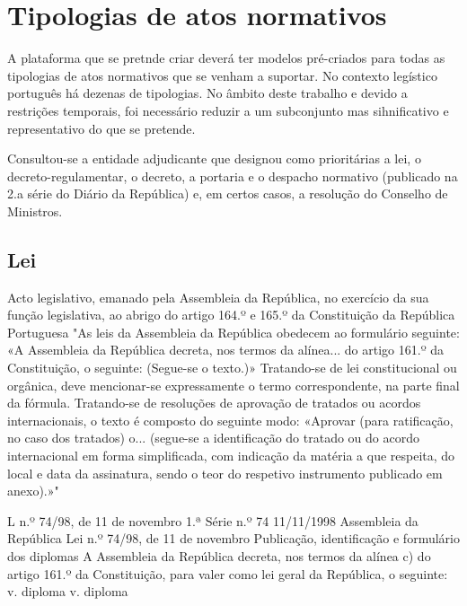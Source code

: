 \chapter{Tipologias de atos normativos}
\label{tipologias}

A plataforma que se pretnde criar deverá ter modelos pré-criados para todas as tipologias de atos normativos 
que se venham a suportar. No contexto legístico português há dezenas de tipologias. No âmbito deste trabalho e devido a 
restrições temporais, foi necessário reduzir a um subconjunto mas sihnificativo e representativo do que se pretende.

Consultou-se a entidade adjudicante que designou como prioritárias a lei, o decreto-regulamentar, o decreto, a portaria e o despacho normativo 
(publicado na 2.a série do Diário da República) e, em certos casos, a resolução do Conselho de Ministros.

\section{Lei}

Acto legislativo, emanado pela Assembleia da República, no exercício da sua função legislativa, ao abrigo do artigo 164.º e 165.º da Constituição da República Portuguesa
"As leis da Assembleia da República obedecem ao formulário seguinte:
«A Assembleia da República decreta, nos termos da alínea... do artigo 161.º da Constituição, o seguinte:
(Segue-se o texto.)» Tratando-se de lei constitucional ou orgânica, deve mencionar-se expressamente o termo correspondente, na parte final da fórmula. Tratando-se de resoluções de aprovação de tratados ou acordos internacionais, o texto é composto do seguinte modo:
«Aprovar (para ratificação, no caso dos tratados) o... (segue-se a identificação do tratado ou do acordo internacional em forma simplificada, com indicação da matéria a que respeita, do local e data da assinatura, sendo o teor do respetivo instrumento publicado em anexo).»"

L n.º 74/98, de 11 de novembro
1.ª Série
n.º 74
11/11/1998
Assembleia da República
Lei n.º 74/98, de 11 de novembro
Publicação, identificação e formulário dos diplomas
A Assembleia da República decreta, nos termos da alínea c) do artigo 161.º da Constituição, para valer como lei geral da República, o seguinte:
v. diploma
v. diploma

